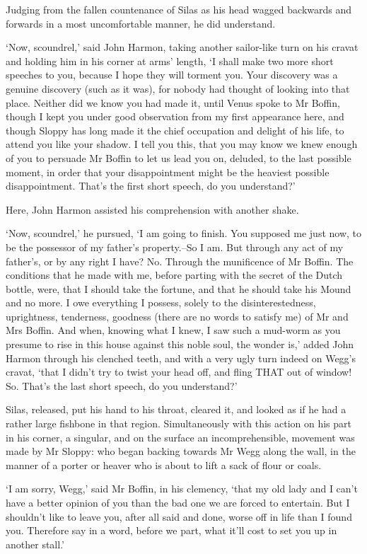 Judging from the fallen countenance of Silas as his head wagged
backwards and forwards in a most uncomfortable manner, he did
understand.

‘Now, scoundrel,’ said John Harmon, taking another sailor-like turn on
his cravat and holding him in his corner at arms’ length, ‘I shall make
two more short speeches to you, because I hope they will torment you.
Your discovery was a genuine discovery (such as it was), for nobody had
thought of looking into that place. Neither did we know you had made it,
until Venus spoke to Mr Boffin, though I kept you under good observation
from my first appearance here, and though Sloppy has long made it
the chief occupation and delight of his life, to attend you like your
shadow. I tell you this, that you may know we knew enough of you to
persuade Mr Boffin to let us lead you on, deluded, to the last possible
moment, in order that your disappointment might be the heaviest possible
disappointment. That’s the first short speech, do you understand?’

Here, John Harmon assisted his comprehension with another shake.

‘Now, scoundrel,’ he pursued, ‘I am going to finish. You supposed me
just now, to be the possessor of my father’s property.--So I am. But
through any act of my father’s, or by any right I have? No. Through the
munificence of Mr Boffin. The conditions that he made with me, before
parting with the secret of the Dutch bottle, were, that I should take
the fortune, and that he should take his Mound and no more. I owe
everything I possess, solely to the disinterestedness, uprightness,
tenderness, goodness (there are no words to satisfy me) of Mr and Mrs
Boffin. And when, knowing what I knew, I saw such a mud-worm as you
presume to rise in this house against this noble soul, the wonder is,’
added John Harmon through his clenched teeth, and with a very ugly turn
indeed on Wegg’s cravat, ‘that I didn’t try to twist your head off,
and fling THAT out of window! So. That’s the last short speech, do you
understand?’

Silas, released, put his hand to his throat, cleared it, and looked as
if he had a rather large fishbone in that region. Simultaneously with
this action on his part in his corner, a singular, and on the surface
an incomprehensible, movement was made by Mr Sloppy: who began backing
towards Mr Wegg along the wall, in the manner of a porter or heaver who
is about to lift a sack of flour or coals.

‘I am sorry, Wegg,’ said Mr Boffin, in his clemency, ‘that my old lady
and I can’t have a better opinion of you than the bad one we are forced
to entertain. But I shouldn’t like to leave you, after all said and
done, worse off in life than I found you. Therefore say in a word,
before we part, what it’ll cost to set you up in another stall.’

